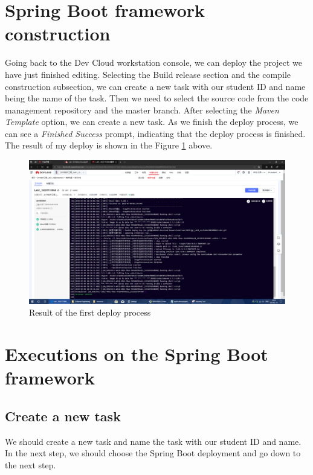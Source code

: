 \documentclass[a4paper]{report}
\begin{document}
\section{Spring Boot framework construction}
Going back to the Dev Cloud workstation console, we can deploy the project we have just finished editing. Selecting the Build release section and the compile construction subsection, we can create a new task with our student ID and name being the name of the task. Then we need to select the source code from the code management repository and the master branch. After selecting the \emph{Maven Template} option, we can create a new task. As we finish the deploy process, we can see a \emph{Finished Success} prompt, indicating that the deploy process is finished. The result of my deploy is shown in the Figure \ref{7} above.
\begin{figure}
  \centering
  \includegraphics[width=12cm]{Figures/Screenshot(33).png}
  \caption{Result of the first deploy process}\label{7}
\end{figure}
\section{Executions on the Spring Boot framework}
\subsection{Create a new task}
We should create a new task and name the task with our student ID and name. In the next step, we should choose the Spring Boot deployment and go down to the next step.
\end{document}
